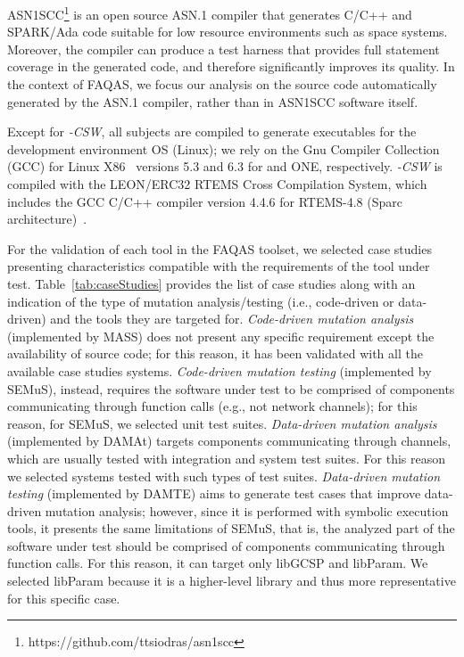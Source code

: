 ASN1SCC\footnote{https://github.com/ttsiodras/asn1scc} is an open source ASN.1 compiler that generates C/C++ and SPARK/Ada code suitable for low resource environments such as space systems. Moreover, the compiler can produce a test harness that provides full statement coverage in the generated code, and therefore significantly improves its quality. In the context of FAQAS, we focus our analysis on the source code automatically generated by the ASN.1 compiler, rather than in ASN1SCC software itself. 

Except for \SAIL{}\emph{-CSW}, all subjects
are compiled to generate executables for the development environment OS (Linux); we rely on the Gnu Compiler Collection (GCC)  for Linux X86~\cite{GCC} versions 5.3 and 6.3 for \MLFS{}{} and ONE, respectively. \SAIL{}\emph{-CSW} is compiled with the
LEON/ERC32 RTEMS Cross Compilation System, which includes the GCC C/C++ compiler version 4.4.6 for  RTEMS-4.8 (Sparc architecture)~\cite{RTEMS}.






For the validation of each tool in the FAQAS toolset, we selected case studies presenting characteristics compatible with the requirements of the tool under test. Table~\ref{tab:caseStudies} provides the list of case studies along with an indication of the type of mutation analysis/testing (i.e., code-driven or data-driven) and the tools they are targeted for.  \emph{Code-driven mutation analysis} (implemented by MASS) does not present any specific requirement except the availability of source code; for this reason, it has been validated with all the available case studies systems.
\emph{Code-driven mutation testing} (implemented by SEMuS), instead, requires the software under test to be comprised of components communicating through function calls (e.g., not network channels); for this reason, for SEMuS, we selected unit test suites.
\emph{Data-driven mutation analysis} (implemented by DAMAt) targets components communicating through channels, which are usually tested with integration and system test suites. For this reason we selected systems tested with such types of test suites.
\emph{Data-driven mutation testing} (implemented by DAMTE) aims to generate test cases that improve data-driven mutation analysis; however, since it is performed with symbolic execution tools, it presents the same limitations of SEMuS, that is, the analyzed part of the software under test should be comprised of components communicating through function calls. For this reason, it can target only libGCSP and libParam. We selected libParam because it is a higher-level library and thus more representative for this specific case.


